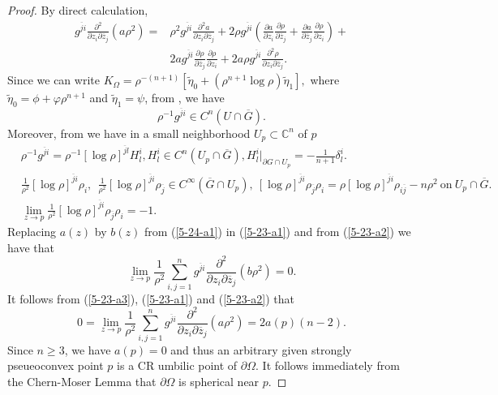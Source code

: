 \documentclass[a4paper,centertags,osxzneside,12pt]{amsart}
\numberwithin{equation}{section}
\begin{document}
\begin{proof}
By direct calculation,
\begin{equation}\label{5-23-a1}
\begin{split}
     g^{\overline ji}\frac{\partial^2}{\partial z_i\partial\overline z_j}(a\rho^2)=&\rho^2 g^{\overline j i}\frac{\partial^2 a}{\partial z_i\partial\overline z_j}+2\rho g^{\overline j i}\left(\frac{\partial a}{\partial z_i}\frac{\partial\rho}{\partial \overline z_j}+\frac{\partial a}{\partial \overline z_j}\frac{\partial \rho}{\partial z_i}\right)+\\
    &2a g^{\overline j i}\frac{\partial \rho}{\partial\overline z_j}\frac{\partial\rho}{\partial z_i}+2a\rho g^{\overline ji}\frac{\partial^2 \rho}{\partial z_i\partial\overline z_j}.
    \end{split}
\end{equation}
Since we can write $K_{\Omega}=\rho^{-(n+1)}[\widetilde \eta_0+(\rho^{n+1}\log\rho)\widetilde\eta_1],$
where $\widetilde\eta_0=\phi+\varphi\rho^{n+1}$ and $\widetilde\eta_1=\psi$, from  \cite[Theorem 3]{Eng08}, we have 
\begin{equation}
    \rho^{-1} g^{\overline j i}\in C^n(U\cap\overline G).
\end{equation}
Moreover, from \cite[Section 3]{Eng08} we have in  a small neighborhood $U_p\subset {\mathbb C}^n$ of $p$
\begin{equation}\label{5-23-a2}
\begin{split}
    &\rho^{-1}g^{\overline j i}=\rho^{-1}[\log \rho]^{\overline j l}H^i_l, H^i_l\in C^n(U_p\cap\overline G), H^i_l|_{\partial G\cap U_p}=-\frac{1}{n+1}\delta^i_l.\\
    &\frac{1}{\rho^2}[\log\rho]^{\overline j i}\rho_i, ~~\frac{1}{\rho^2}[\log\rho]^{\overline j i}\rho_{\overline j}\in C^\infty(\overline G\cap U_p),~[\log \rho]^{\overline j i}\rho_{\overline j}\rho_i=\rho [\log \rho]^{\overline j i}\rho_{i\overline j}-n\rho^2~\text{on}~U_p\cap\overline G.\\
    &\lim_{z\rightarrow p} \frac{1}{\rho^2}[\log \rho]^{\overline j i}\rho_{\overline j}\rho_i=-1.
    \end{split}
\end{equation}
Replacing $a(z)$ by $b(z)$ from (\ref{5-24-a1}) in (\ref{5-23-a1}) and from (\ref{5-23-a2}) we have that
\begin{equation}
    \lim_{z\rightarrow p}\frac{1}{\rho^2}\sum_{i, j=1}^n g^{\overline ji}\frac{\partial^2}{\partial z_i\partial\overline z_j}(b\rho^2)=0.
\end{equation}
It follows from (\ref{5-23-a3}), (\ref{5-23-a1}) and (\ref{5-23-a2}) that 
\begin{equation}
    0=\lim_{z\rightarrow p}\frac{1}{\rho^2}\sum_{i, j=1}^n g^{\overline ji}\frac{\partial^2}{\partial z_i\partial\overline z_j}(a\rho^2)=2a(p)(n-2).
\end{equation}
Since $n\geq 3$, we have $a(p)=0$ and thus an arbitrary given strongly pseueoconvex point $p$ is a CR umbilic point of $\partial\Omega$.
It follows immediately from the Chern-Moser Lemma \cite{CM74} that $\partial\Omega$ is spherical near $p$.
\end{proof}
\end{document}
